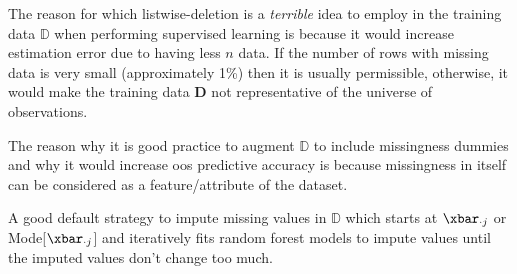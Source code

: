 \documentclass[12pt]{article}
\begin{document}
\begin{enumerate}
\begin{tcolorbox}[colback=white, sharp corners]
The reason for which listwise-deletion is a \textit{terrible} idea to employ in the training data $\mathbb{D}$ when performing supervised learning is because it would increase estimation error due to having less $n$ data. If the number of rows with missing data is very small (approximately 1\%) then it is usually permissible, otherwise, it would make the training data $\mathbf{D}$ not representative of the universe of observations.
\end{tcolorbox}


\begin{tcolorbox}[colback=white, sharp corners]
The reason why it is good practice to augment $\mathbb{D}$ to include missingness dummies and why it would increase oos predictive accuracy is because missingness in itself can be considered as a feature/attribute of the dataset. 
\end{tcolorbox}


\begin{tcolorbox}[colback=white, sharp corners]
A good default strategy to impute missing values in $\mathbb{D}$ which starts at $\xbar_{\cdot j}$ or Mode[$\xbar_{\cdot j}$] and iteratively fits random forest models to impute values until the imputed values don't change too much. 
\end{tcolorbox}

\end{enumerate}
\end{document}
